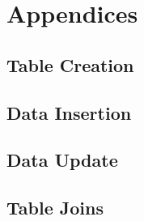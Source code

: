 \section{Appendices}
\subsection{Table Creation}


\subsection{Data Insertion}


\subsection{Data Update}


\subsection{Table Joins}

